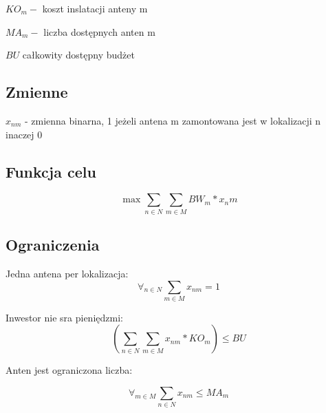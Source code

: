 \documentclass{article}
\begin{document}
$KO_m -$ koszt inslatacji anteny m

$MA_m -$ liczba dostępnych anten m

$BU$ całkowity dostępny budżet

\subsection{Zmienne}
$x_{nm}$ - zmienna binarna, 1 jeżeli antena m zamontowana jest w lokalizacji n inaczej 0


\subsection{Funkcja celu}

\begin{equation}

  \max \sum_{n \in N} \sum_{m \in M} BW_m * x_nm

\end{equation}

\subsection{Ograniczenia}

Jedna antena per lokalizacja:
\begin{equation}
  \forall_{n \in N} \sum_{m \in M} x_{nm} = 1
\end{equation}

Inwestor nie sra pieniędzmi:
\begin{equation}
  (\sum_{n \in N} \sum_{m \in M} x_{nm} * {KO}_m) \leq BU
\end{equation}

Anten jest ograniczona liczba:

\begin{equation}
  \forall_{m \in M} \sum_{n \in N} x_{nm} \leq {MA}_m
\end{equation}
\end{document}
